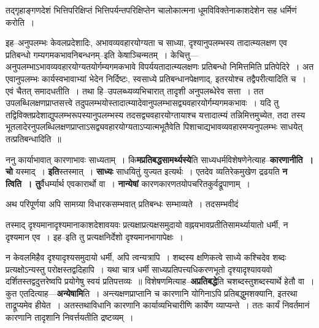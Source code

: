 \documentclass[article,12pt,a4paper]{memoir}
\begin{document}
	  \pstart तद्गृहाङ्गणदेशं भित्तिपरिक्षिप्तं भित्तिपर्यन्तपरिक्षिप्तेन चालोकात्मना धूमविविक्तेनाकाशदेशेन सह धर्मिणं करोति ।
	\pend
      
	  \endgroup
	

	  \pstart इह--अनुपलम्भः केवलप्रदेशादिः, अभावव्यवहारयोग्यता च साध्या, दृश्यानुपलम्भस्य तादात्म्यलक्षण एव प्रतिबन्धो गम्यगमकभावनिबन्धनम्--इति केषाञ्चिन्मतम् । केचित्तु—अनुपलम्भाऽभावव्यवहारयोग्यतयोर्गम्यगमकभावे विपर्ययतादात्म्यलक्षणः प्रतिबन्धो निमित्तमिति प्रतिपेदिरे । अत एवानुपलम्भः कार्यस्वभावाभ्यां भेदेन निर्दिष्टः, स्वसाध्ये प्रतिबन्धानपेक्षणाद्, इतरयोश्च तद्वैपरीत्यादिति च । एवं चैतत् समादधतीति । तथा हि--उपलब्ध्यव्यभिचारात् तादृशी अनुपलब्धेरेव सत्ता । तत उपलब्धिलक्षणप्राप्तसत्त्वे तदुपलम्भयोस्तादात्म्यादेवानुपलम्भासद्व्यवहारयोर्गम्यगमकभावः । यदि तु तद्विविक्तप्रदेशाद्युपलम्भरूपस्यानुपलम्भस्य तदसद्व्यवहारयोग्तायाश्च यत्तादात्म्यं तन्निमित्तमुच्येत, तदा तस्य भूतलादेरनुपलब्धिलक्षणप्राप्ताऽसद्व्यवहारयोग्यताऽप्यात्मभूतैवेति पिशाचाद्यभावव्यवहारमप्यनुपलम्भः साधयेत् तत्प्रतिबन्धादिति ॥
	\pend
      

	  \pstart ननु कार्याभावात् कारणाभावः साध्यताम् । कि\textbf{मप्रतिबद्धसामर्थ्यस्ये}ति साध्यधर्मविशेषणेनेत्याह--\textbf{कारणानीति । चो} यस्माद् । \textbf{इति}स्तस्मात् । \textbf{साध्यः} साधयितुं युज्यत इत्यर्थः । एतदेव व्यतिरेकमुखेण द्रढयति \textbf{न त्विति । तु}र्वैधर्म्यार्थ एवकारार्थो वा । \textbf{नान्येषां} कारणकारणतयोपचरितकुर्वद्रूपाणाम् ।
	\pend
      

	  \pstart अथ परिपूर्णया अपि सामग्र्या विधारकसम्भवात् प्रतिबन्धः सम्भाव्यते । तदसम्भवीदं  \leavevmode{} 
	  
	तस्माद् दृश्यमानादृश्यमानाकाशदेशावयवः प्रत्यक्षाप्रत्यक्षसमुदायो वह्नयभावप्रतीतिसामर्थ्यायातो धर्मी, न दृश्यमान एव । इह--इति तु प्रत्यक्षनिर्देशो दृश्यमानभागापेक्षः ।  
	  
	न केवलमिहैव दृश्यादृश्यसमुदायो धर्मी, अपि त्वन्यत्रापि । शब्दस्य क्षणिकत्वे साध्ये कश्चिदेव शब्दः प्रत्यक्षोऽन्यस्तु परोक्षस्तद्वदिहापि । यथा चात्र धर्मी साध्यप्रतिपत्त्यधिकरणभूतो दृश्यादृश्यावयवो दर्शितस्तद्वदुत्तरेष्वपि प्रयोगेषु स्वयं प्रतिपत्तव्यः ॥ विशेषणमित्याह--\textbf{अप्रतिबद्धे}ति चशब्दस्तुशब्दस्यार्थे हेतौ वा । कुत एतदित्याह—\textbf{अन्येषामि}ति । अन्त्यक्षणप्राप्तानि च कारणानि योगिनाऽपि प्रतिबद्धुमशक्यानि, इतरथा ताद्रूप्यमेव हीयेत । अतस्तथाविधानि कारणानि कार्याव्यभिचारीणि कार्येण व्याप्यन्ते । ततः कार्यं निवर्तमानं कारणानि तादृशानि निवर्त्तयतीति द्रष्टव्यम् ।
	\pend
      
\end{document}
